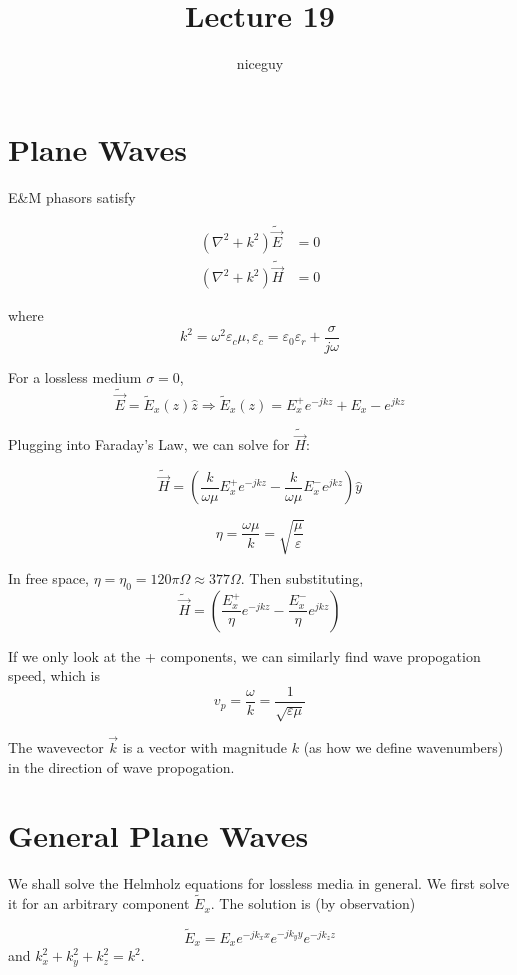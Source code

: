 \documentclass[12pt]{article}
\title{Lecture 19}
\author{niceguy}
\begin{document}
\maketitle

\section{Plane Waves}

E\&M phasors satisfy

\begin{align*}
    (\nabla^2 + k^2)\tilde{\vec E} &= 0 \\
    (\nabla^2 + k^2)\tilde{\vec H} &= 0
\end{align*}

where
$$k^2 = \omega^2\varepsilon_c\mu, \varepsilon_c = \varepsilon_0\varepsilon_r + \frac{\sigma}{j\omega}$$

For a lossless medium $\sigma = 0$, 
$$\tilde{\vec E} = \tilde E_x(z)\hat z \Rightarrow \tilde E_x(z) = E_x^+e^{-jkz} + E_x-e^{jkz}$$

Plugging into Faraday's Law, we can solve for $\tilde{\vec H}$:

$$\tilde{\vec H} = \left(\frac{k}{\omega\mu}E_x^+e^{-jkz} - \frac{k}{\omega\mu}E_x^-e^{jkz}\right)\hat y$$

\begin{defn}
    $$\eta = \frac{\omega\mu}{k} = \sqrt{\frac{\mu}{\varepsilon}}$$
\end{defn}

In free space, $\eta = \eta_0 = 120\pi\unit{\Omega} \approx 377\unit{\Omega}$. Then substituting,
$$\tilde{\vec H} = \left(\frac{E_x^+}{\eta}e^{-jkz} - \frac{E_x^-}{\eta}e^{jkz}\right)$$

If we only look at the + components, we can similarly find wave propogation speed, which is
$$v_p = \frac{\omega}{k} = \frac{1}{\sqrt{\varepsilon\mu}}$$

\begin{defn}[Wavevector]
    The wavevector $\vec k$ is a vector with magnitude $k$ (as how we define wavenumbers) in the direction of wave propogation.
\end{defn}

\section{General Plane Waves}

We shall solve the Helmholz equations for lossless media in general. We first solve it for an arbitrary component $\tilde E_x$. The solution is (by observation)

$$\tilde E_x = E_x e^{-jk_xx} e^{-jk_yy} e^{-jk_zz}$$
and $k_x^2 + k_y^2 + k_z^2 = k^2$.
\end{document}
